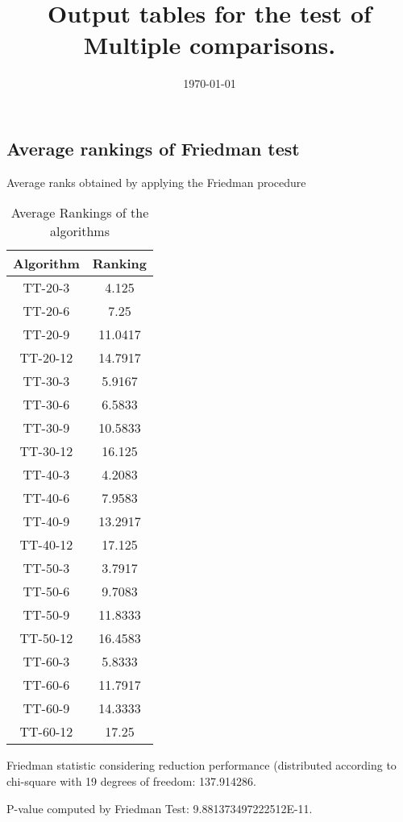 \documentclass[a4paper,10pt]{article}
\title{Output tables for the test of Multiple comparisons.}
\author{}
\date{\today}
\begin{document}
\begin{landscape}
\pagestyle{empty}
\maketitle
\thispagestyle{empty}
\section{Average rankings of Friedman test}



Average ranks obtained by applying the Friedman procedure

\begin{table}[!htp]
\centering
\begin{tabular}{|c|c|}\hline
Algorithm&Ranking\\\hline
TT-20-3 & 4.125\\
TT-20-6 & 7.25\\
TT-20-9 & 11.0417\\
TT-20-12 & 14.7917\\
TT-30-3 & 5.9167\\
TT-30-6 & 6.5833\\
TT-30-9 & 10.5833\\
TT-30-12 & 16.125\\
TT-40-3 & 4.2083\\
TT-40-6 & 7.9583\\
TT-40-9 & 13.2917\\
TT-40-12 & 17.125\\
TT-50-3 & 3.7917\\
TT-50-6 & 9.7083\\
TT-50-9 & 11.8333\\
TT-50-12 & 16.4583\\
TT-60-3 & 5.8333\\
TT-60-6 & 11.7917\\
TT-60-9 & 14.3333\\
TT-60-12 & 17.25\\
\hline
\end{tabular}
\caption{Average Rankings of the algorithms}
\end{table}

Friedman statistic considering reduction performance (distributed according to chi-square with 19 degrees of freedom: 137.914286.

P-value computed by Friedman Test: 9.881373497222512E-11.\newline




\end{landscape}
\end{document}
